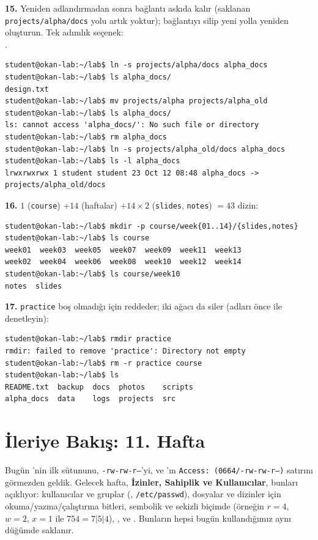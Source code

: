 \textbf{15.} Yeniden adlandırmadan sonra bağlantı askıda kalır (saklanan \texttt{projects/alpha/docs} yolu artık yoktur); bağlantıyı silip yeni yolla yeniden oluşturun. Tek adımlık seçenek:\\ .
\begin{lstlisting}[style=term,basicstyle=\ttfamily\scriptsize\color{light}]
student@okan-lab:~/lab$ ln -s projects/alpha/docs alpha_docs
student@okan-lab:~/lab$ ls alpha_docs/
design.txt
student@okan-lab:~/lab$ mv projects/alpha projects/alpha_old
student@okan-lab:~/lab$ ls alpha_docs/
ls: cannot access 'alpha_docs/': No such file or directory
student@okan-lab:~/lab$ rm alpha_docs
student@okan-lab:~/lab$ ln -s projects/alpha_old/docs alpha_docs
student@okan-lab:~/lab$ ls -l alpha_docs
lrwxrwxrwx 1 student student 23 Oct 12 08:48 alpha_docs -> projects/alpha_old/docs
\end{lstlisting}

\textbf{16.} $1$ (\texttt{course}) $+ 14$ (haftalar) $+ 14 \times 2$ (\texttt{slides}, \texttt{notes}) $= 43$ dizin:
\begin{lstlisting}[style=term,basicstyle=\ttfamily\scriptsize\color{light}]
student@okan-lab:~/lab$ mkdir -p course/week{01..14}/{slides,notes}
student@okan-lab:~/lab$ ls course
week01  week03  week05  week07  week09  week11  week13
week02  week04  week06  week08  week10  week12  week14
student@okan-lab:~/lab$ ls course/week10
notes  slides
\end{lstlisting}

\textbf{17.} \texttt{practice} boş olmadığı için  reddeder;  iki ağacı da siler (adları önce  ile denetleyin):
\begin{lstlisting}[style=term,basicstyle=\ttfamily\scriptsize\color{light}]
student@okan-lab:~/lab$ rmdir practice
rmdir: failed to remove 'practice': Directory not empty
student@okan-lab:~/lab$ rm -r practice course
student@okan-lab:~/lab$ ls
README.txt  backup  docs  photos    scripts
alpha_docs  data    logs  projects  src
\end{lstlisting}

\section{İleriye Bakış: 11. Hafta}

Bugün 'nin ilk sütununu, \texttt{-rw-rw-r--}'yi, ve 'ın \texttt{Access: (0664/-rw-rw-r--)} satırını görmezden geldik. Gelecek hafta, \textbf{İzinler, Sahiplik ve Kullanıcılar}, bunları açıklıyor: kullanıcılar ve gruplar (, \texttt{/etc/passwd}), dosyalar ve dizinler için okuma/yazma/çalıştırma bitleri, sembolik ve sekizli biçimde  (örneğin $r = 4$, $w = 2$, $x = 1$ ile $754 = 7|5|4$), ,  ve . Bunların hepsi bugün kullandığımız aynı düğümde saklanır.

